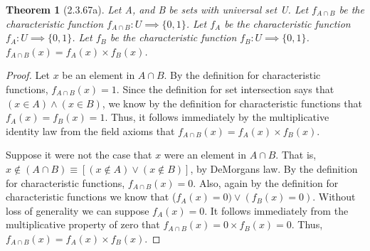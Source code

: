 \documentclass[a4paper, 12pt]{article}
\theoremstyle{plain}
\newtheorem*{theorem*}{Theorem}
\begin{document}
	
	\begin{theorem*}[2.3.67a]
		Let A, and B be sets with universal set U. Let $f_{A \cap B}$ be the characteristic 
		function $f_{A \cap B}: U \implies \{0, 1\}$. Let $f_{A}$ be the characteristic function 
		$f_{A}: U \implies \{0, 1\}$. Let $f_{B}$ be the characteristic function \newline 
		$f_{B}: U \implies \{0, 1\}$. $f_{A \cap B}(x) = f_{A}(x) \times f_{B}(x)$.
	\end{theorem*}
	
	\begin{proof}
		Let $x$ be an element in $A \cap B$. By the definition for characteristic functions, 
		$f_{A \cap B}(x) = 1$. Since the definition for set intersection says that \newline 
		$(x \in A) \land (x \in B)$, we know by the definition for characteristic functions that 
		$f_{A}(x) = f_{B}(x) = 1$. Thus, it follows immediately by the multiplicative identity law 
		from the field axioms that $f_{A \cap B}(x) = f_{A}(x) \times f_{B}(x)$.
		
		Suppose it were not the case that $x$ were an element in $A \cap B$. That is, 
		$x \notin (A \cap B) \equiv [(x \notin A) \lor (x \notin B)]$, by DeMorgans law. By the 
		definition for characteristic functions, $f_{A \cap B}(x) = 0$. Also, again by the definition 
		for characteristic functions we know that ($f_{A}(x) = 0) \lor (f_{B}(x) = 0)$. Without loss 
		of generality we can suppose $f_{A}(x) = 0$. It follows immediately from the multiplicative 
		property of zero that $f_{A \cap B}(x) = 0 \times f_{B}(x) = 0$. Thus, 
		$f_{A \cap B}(x) = f_{A}(x) \times f_{B}(x)$.
	\end{proof}
\end{document}
